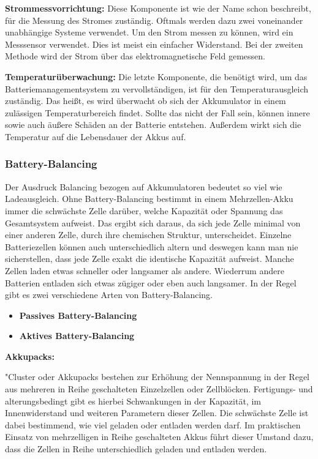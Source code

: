 \textbf{Strommessvorrichtung:}
Diese Komponente ist wie der Name schon beschreibt, für die Messung des Stromes zuständig. Oftmals werden dazu zwei voneinander unabhängige Systeme verwendet. Um den Strom messen zu können, wird ein Messsensor verwendet. Dies ist meist ein einfacher Widerstand. Bei der zweiten Methode wird der Strom über das elektromagnetische Feld gemessen.

\textbf{Temperaturüberwachung:}
Die letzte Komponente, die benötigt wird, um das Batteriemanagementsystem zu vervollständigen, ist für den Temperaturausgleich zuständig. Das heißt, es wird überwacht ob sich der Akkumulator in einem zulässigen Temperaturbereich findet. Sollte das nicht der Fall sein, können innere sowie auch äußere Schäden an der Batterie entstehen. Außerdem wirkt sich die Temperatur auf die Lebensdauer der Akkus auf.
\newpage

\subsubsection{Battery-Balancing}
\label{Battery-Balancing}
Der Ausdruck Balancing bezogen auf Akkumulatoren bedeutet so viel wie Ladeausgleich. Ohne Battery-Balancing bestimmt in einem Mehrzellen-Akku immer die schwächste Zelle darüber, welche Kapazität oder Spannung das Gesamtsystem aufweist. Das ergibt sich daraus, da sich jede Zelle minimal von einer anderen Zelle, durch ihre chemischen Struktur, unterscheidet. Einzelne Batteriezellen können auch unterschiedlich altern und deswegen kann man nie sicherstellen, dass jede Zelle exakt die identische Kapazität aufweist. Manche Zellen laden etwas schneller oder langsamer als andere. Wiederrum andere Batterien entladen sich etwas zügiger oder eben auch langsamer. In der Regel gibt es zwei verschiedene Arten von Battery-Balancing.
\begin{itemize}
\item \textbf{Passives Battery-Balancing} \medskip\\
\item \textbf{Aktives Battery-Balancing} \medskip\\
\end{itemize}


\textbf{Akkupacks:}

"Cluster oder Akkupacks bestehen zur Erhöhung der Nennspannung in der Regel aus mehreren in Reihe geschalteten Einzelzellen oder Zellblöcken. Fertigungs- und alterungsbedingt gibt es hierbei Schwankungen in der Kapazität, im Innenwiderstand und weiteren Parametern dieser Zellen. Die schwächste Zelle ist dabei bestimmend, wie viel geladen oder entladen werden darf. Im praktischen Einsatz von mehrzelligen in Reihe geschalteten Akkus führt dieser Umstand dazu, dass die Zellen in Reihe unterschiedlich geladen und entladen werden.

